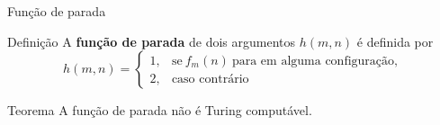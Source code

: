 \begin{frame}[fragile]{Função de parada}

    \begin{block}{Definição}
        A \textbf{função de parada} de dois argumentos $h(m, n)$ é definida por
        \[
            h(m, n) = \left\lbrace \begin{array}{ll}
                1,& \mbox{se}\ f_m(n)\ \mbox{para em alguma configuração}, \\
                2,& \mbox{caso contrário}
            \end{array}\right.
        \]
    \end{block}

    \vspace{0.2in}

    \begin{block}{Teorema}
        A função de parada não é Turing computável.
    \end{block}

\end{frame}
